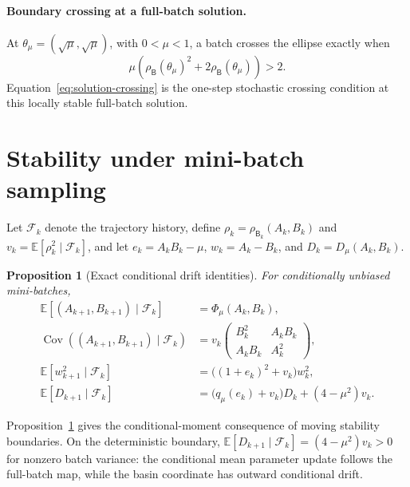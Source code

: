 \documentclass[11pt]{article}
\newtheorem{proposition}[theorem]{Proposition}
\newcommand{\E}{\mathbb E}
\newcommand{\Fcal}{\mathcal F}
\begin{document}
\paragraph{Boundary crossing at a full-batch solution.}
At \(\theta_\mu=(\sqrt\mu,\sqrt\mu)\), with \(0<\mu<1\), a batch crosses
the ellipse exactly when
\begin{equation}
\label{eq:solution-crossing}
    \mu(\rho_{\mathsf B}(\theta_\mu)^2
    +2\rho_{\mathsf B}(\theta_\mu))>2.
\end{equation}
Equation~\eqref{eq:solution-crossing} is the one-step stochastic crossing
condition at this locally stable full-batch solution.

\section{Stability under mini-batch sampling}
\label{sec:moments}

Let \(\Fcal_k\) denote the trajectory history, define
\(\rho_k=\rho_{\mathsf B_k}(A_k,B_k)\) and
\(v_k=\E[\rho_k^2\mid\Fcal_k]\), and let \(e_k=A_kB_k-\mu\),
\(w_k=A_k-B_k\), and \(D_k=D_\mu(A_k,B_k)\).

\begin{proposition}[Exact conditional drift identities]
\label{thm:moments}
For conditionally unbiased mini-batches,
\begin{align}
\E[(A_{k+1},B_{k+1})\mid\Fcal_k]
&=\Phi_\mu(A_k,B_k), \label{eq:mean-map}\\
\operatorname{Cov}((A_{k+1},B_{k+1})\mid\Fcal_k)
&=
v_k
\begin{pmatrix}
B_k^2&A_kB_k\\
A_kB_k&A_k^2
\end{pmatrix}, \label{eq:cov-map}\\
\E[w_{k+1}^2\mid\Fcal_k]
&=\bigl((1+e_k)^2+v_k\bigr)w_k^2, \label{eq:w2}\\
\E[D_{k+1}\mid\Fcal_k]
&=\bigl(q_\mu(e_k)+v_k\bigr)D_k
 +(4-\mu^2)v_k. \label{eq:D-drift}
\end{align}
\end{proposition}

Proposition~\ref{thm:moments} gives the conditional-moment consequence of
moving stability boundaries.  On the deterministic boundary,
\(\E[D_{k+1}\mid\Fcal_k]=(4-\mu^2)v_k>0\) for nonzero batch variance:
the conditional mean parameter update follows the full-batch map, while the
basin coordinate has outward conditional drift.
\end{document}
